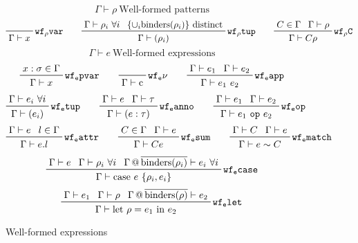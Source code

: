 \documentclass[letterpaper]{article}
\begin{document}
\begin{figure}
  $$ \boxed{\Gamma\vdash \rho}\ \textrm{Well-formed patterns} $$
  $$ \prfbyaxiom{$\mathtt{wf_\rho var}$}
             {\Gamma\vdash x}\qquad
     \prftree[r]{$\mathtt{wf_\rho tup}$}
             {\prfassumption{\Gamma\vdash\rho_i\ \forall i}}
             {\prfassumption{\{\cup_i\mathrm{binders}(\rho_i)\}\textrm{ distinct}}}
             {\Gamma\vdash (\rho_i)}\qquad
     \prftree[r]{$\mathtt{wf_\rho C}$}
             {\prfassumption{C\in\Gamma}}{\prfassumption{\Gamma\vdash\rho}}
             {\Gamma\vdash C\rho} $$
  $$ \boxed{\Gamma\vdash e}\ \textrm{Well-formed expressions} $$
  $$ \prftree[r]{$\mathtt{wf_e pvar}$}
             {\prfassumption{x:\sigma\in\Gamma}}
             {\Gamma\vdash x}\qquad
     \prfbyaxiom{$\mathtt{wf_e \nu}$}
             {\Gamma\vdash \textrm{c}}\qquad
     \prftree[r]{$\mathtt{wf_e app}$}
             {\prfassumption{\Gamma\vdash e_1}}{\prfassumption{\Gamma\vdash e_2}}
             {\Gamma\vdash e_1\ e_2} $$
  $$ \prftree[r]{$\mathtt{wf_e tup}$}
             {\prfassumption{\Gamma\vdash e_i\ \forall i}}
             {\Gamma\vdash (e_i)}\qquad
     \prftree[r]{$\mathtt{wf_e anno}$}
             {\prfassumption{\Gamma\vdash e}}{\prfassumption{\Gamma\vdash\tau}}
             {\Gamma\vdash (e : \tau)}\qquad
     \prftree[r]{$\mathtt{wf_e op}$}
             {\prfassumption{\Gamma\vdash e_1}}{\prfassumption{\Gamma\vdash e_2}}
             {\Gamma\vdash e_1\ \texttt{op}\ e_2} $$
  $$ \prftree[r]{$\mathtt{wf_e attr}$}
             {\prfassumption{\Gamma\vdash e}}{\prfassumption{l\in\Gamma}}
             {\Gamma\vdash e.l}\qquad
     \prftree[r]{$\mathtt{wf_e sum}$}
             {\prfassumption{C\in\Gamma}}{\prfassumption{\Gamma\vdash e}}
             {\Gamma\vdash C e}\qquad
     \prftree[r]{$\mathtt{wf_e match}$}
             {\prfassumption{\Gamma\vdash C}}{\prfassumption{\Gamma\vdash e}}
             {\Gamma\vdash e \sim C} $$
  $$ \prftree[r]{$\mathtt{wf_e case}$}
             {\prfassumption{\Gamma\vdash e}}{\prfassumption{\Gamma\vdash\rho_i\ \forall i}}
             {\prfassumption{\Gamma\,@\,\overline{\mathrm{binders}(\rho_i)}\vdash e_i\ \forall i}}
             {\Gamma\vdash\textrm{case}\ e\ \{\rho_i, e_i\}} $$
  $$ \prftree[r]{$\mathtt{wf_e let}$}
             {\prfassumption{\Gamma\vdash e_1}}{\prfassumption{\Gamma\vdash\rho}}
             {\prfassumption{\Gamma\,@\,\overline{\mathrm{binders}(\rho)}\vdash e_2}}
             {\Gamma\vdash\textrm{let}\ \rho=e_1\ \textrm{in}\ e_2} $$
  \caption{Well-formed expressions}
  \label{f:wf:expressions}
\end{figure}
\end{document}
